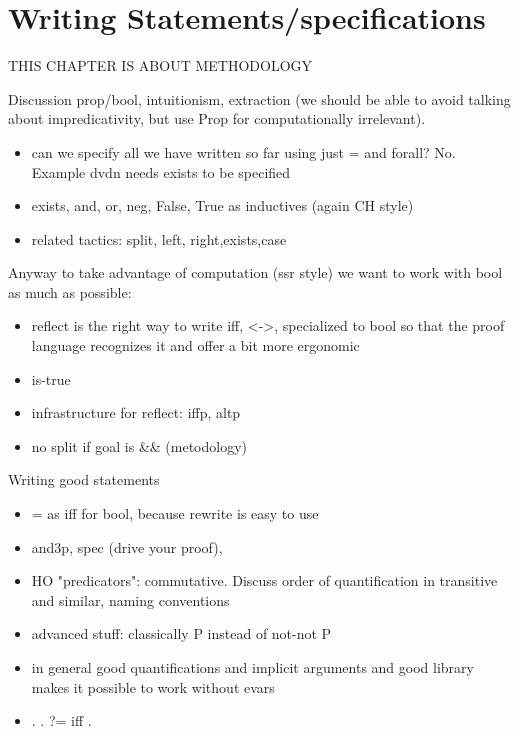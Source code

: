 \chapter{Writing Statements/specifications}
THIS CHAPTER IS ABOUT METHODOLOGY

% 

Discussion prop/bool, intuitionism, extraction (we should be able to avoid talking about impredicativity, but use Prop for computationally irrelevant).

\begin{itemize}
\item can we specify all we have written so far using just = and forall? No.
	Example dvdn needs exists to be specified
\item exists, and, or, neg, False, True as inductives (again CH style)
\item related tactics: split, left, right,exists,case
\end{itemize}

Anyway to take advantage of computation (ssr style) we want to
work with bool as much as possible:

\begin{itemize}
\item reflect is the right way to write iff, <->, specialized to bool
	so that the proof language recognizes it and offer a bit more ergonomic
\item is-true
\item infrastructure for reflect: iffp, altp
\item no split if goal is \&\& (metodology)
\end{itemize}

Writing good statements

\begin{itemize}
\item = as iff for bool, because rewrite is easy to use
\item and3p, spec (drive your proof), 
\item HO "predicators": commutative.  Discuss order of quantification in
	transitive and similar, naming conventions
\item advanced stuff: classically P instead of not-not P
\item in general good quantifications and implicit arguments and good library
	makes it possible to work without evars
\item . \C{<=} . ?= iff .
\end{itemize}


